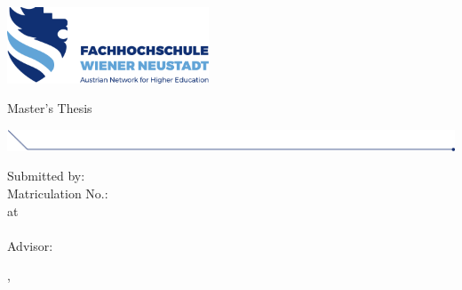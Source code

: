 
\makeatletter

\begin{titlepage}

  \includegraphics[width=6cm]{images/fhwn-logo.png}

  \vspace{70pt}
  {\noindent \linespread{1.3} \color{header-blue} \Huge \textbf{\@title} \par }
  \vspace{5pt}
  {\noindent\LARGE Master's Thesis \par}
  \vspace{20pt}

  \hspace{-35mm}
  \includegraphics[width=18.67cm]{images/titlepage-line.png}

  \vspace{15pt}

  \tabto{2cm}Submitted by: \tabto{7cm}\textbf{\@author} \\
  \tabto{2cm}Matriculation No.: \tabto{7cm}\textbf{\matriculationNumber} \\
  \vspace{15pt}
  \tabto{2cm}at \tabto{7cm}\textbf{\study}\\
  \tabto{7cm}\textbf{\institutename}
  \tabto{7cm}\textbf{\studyprogram} \\
  \vspace{15pt}
  \tabto{2cm}Advisor: \tabto{7cm}\textbf{\advisor}

  \vfill

  \place, \thesisdate
      
\end{titlepage}
\makeatother

